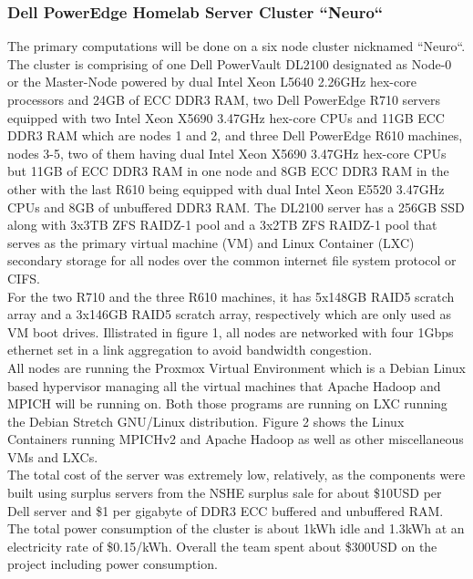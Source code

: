 \documentclass[10pt,journal,compsoc]{IEEEtran}
\begin{document}
\subsubsection{Dell PowerEdge Homelab Server Cluster ``Neuro``}
\indent The primary computations will be done on a six node cluster nicknamed ``Neuro``. The cluster is comprising of one Dell PowerVault DL2100 designated as Node-0 or the Master-Node powered by dual Intel Xeon L5640 2.26GHz hex-core processors and 24GB of ECC DDR3 RAM, two Dell PowerEdge R710 servers equipped with two Intel Xeon X5690 3.47GHz hex-core CPUs and 11GB ECC DDR3 RAM which are nodes 1 and 2, and three Dell PowerEdge R610 machines, nodes 3-5, two of them having dual Intel Xeon X5690 3.47GHz hex-core CPUs but 11GB of ECC DDR3 RAM in one node and 8GB ECC DDR3 RAM in the other with the last R610 being equipped with dual Intel Xeon E5520 3.47GHz CPUs and 8GB of unbuffered DDR3 RAM.  The DL2100 server has a 256GB SSD along with 3x3TB ZFS RAIDZ-1 pool and a 3x2TB ZFS RAIDZ-1 pool that serves as the primary virtual machine (VM) and Linux Container (LXC) secondary storage for all nodes over the common internet file system protocol or CIFS. \\
\indent For the two R710 and the three R610 machines, it has 5x148GB RAID5 scratch array and a 3x146GB RAID5 scratch array, respectively which are only used as VM boot drives. Illistrated in figure 1, all nodes are networked with four 1Gbps ethernet set in a link aggregation to avoid bandwidth congestion. \\
\indent All nodes are running the Proxmox Virtual Environment which is a Debian Linux based hypervisor managing all the virtual machines that Apache Hadoop and MPICH will be running on. Both those programs are running on LXC running the Debian Stretch GNU/Linux distribution. Figure 2 shows the Linux Containers running MPICHv2 and Apache Hadoop as well as other miscellaneous VMs and LXCs. \\
\indent The total cost of the server was extremely low, relatively, as the components were built using surplus servers from the NSHE surplus sale for about \$10USD per Dell server and \$1 per gigabyte of DDR3 ECC buffered and unbuffered RAM. The total power consumption of the cluster is about 1kWh idle and 1.3kWh at an electricity rate of \$0.15/kWh. Overall the team spent about \$300USD on the project including power consumption.
\end{document}
